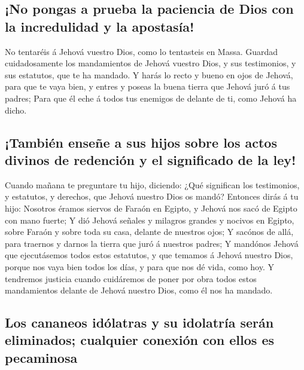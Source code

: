 \hypertarget{no-pongas-a-prueba-la-paciencia-de-dios-con-la-incredulidad-y-la-apostasuxeda}{%
\subsection{¡No pongas a prueba la paciencia de Dios con la incredulidad
y la
apostasía!}\label{no-pongas-a-prueba-la-paciencia-de-dios-con-la-incredulidad-y-la-apostasuxeda}}

 No tentaréis á Jehová vuestro Dios, como lo tentasteis en
Massa.  Guardad cuidadosamente los mandamientos de Jehová
vuestro Dios, y sus testimonios, y sus estatutos, que te ha mandado.
 Y harás lo recto y bueno en ojos de Jehová, para que te
vaya bien, y entres y poseas la buena tierra que Jehová juró á tus
padres;  Para que él eche á todos tus enemigos de delante
de ti, como Jehová ha dicho.

\hypertarget{tambiuxe9n-enseuxf1e-a-sus-hijos-sobre-los-actos-divinos-de-redenciuxf3n-y-el-significado-de-la-ley}{%
\subsection{¡También enseñe a sus hijos sobre los actos divinos de
redención y el significado de la
ley!}\label{tambiuxe9n-enseuxf1e-a-sus-hijos-sobre-los-actos-divinos-de-redenciuxf3n-y-el-significado-de-la-ley}}

 Cuando mañana te preguntare tu hijo, diciendo: ¿Qué
significan los testimonios, y estatutos, y derechos, que Jehová nuestro
Dios os mandó?  Entonces dirás á tu hijo: Nosotros éramos
siervos de Faraón en Egipto, y Jehová nos sacó de Egipto con mano
fuerte;  Y dió Jehová señales y milagros grandes y nocivos
en Egipto, sobre Faraón y sobre toda su casa, delante de nuestros ojos;
 Y sacónos de allá, para traernos y darnos la tierra que
juró á nuestros padres;  Y mandónos Jehová que ejecutásemos
todos estos estatutos, y que temamos á Jehová nuestro Dios, porque nos
vaya bien todos los días, y para que nos dé vida, como hoy.
 Y tendremos justicia cuando cuidáremos de poner por obra
todos estos mandamientos delante de Jehová nuestro Dios, como él nos ha
mandado.

\hypertarget{los-cananeos-iduxf3latras-y-su-idolatruxeda-seruxe1n-eliminados-cualquier-conexiuxf3n-con-ellos-es-pecaminosa}{%
\subsection{Los cananeos idólatras y su idolatría serán eliminados;
cualquier conexión con ellos es
pecaminosa}\label{los-cananeos-iduxf3latras-y-su-idolatruxeda-seruxe1n-eliminados-cualquier-conexiuxf3n-con-ellos-es-pecaminosa}}

